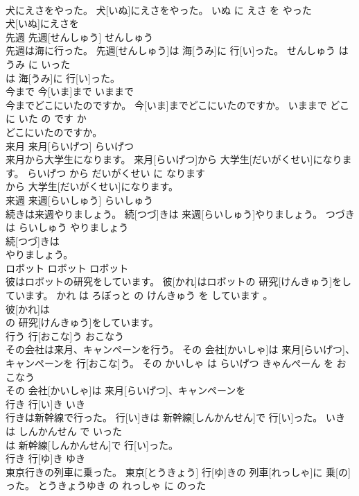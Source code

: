 \documentclass[8pt]{extreport}
\begin{document}
\begin{CJK}{UTF8}{min}
\\	犬にえさをやった。	犬[いぬ]にえさをやった。	いぬ に えさ を やった	
\\	犬[いぬ]にえさを
\\	先週	先週[せんしゅう]	せんしゅう	
\\	先週は海に行った。	先週[せんしゅう]は 海[うみ]に 行[い]った。	せんしゅう は うみ に いった	
\\	は 海[うみ]に 行[い]った。		
\\	今まで	今[いま]まで	いままで	
\\	今までどこにいたのですか。	今[いま]までどこにいたのですか。	いままで どこ に いた の です か	
\\	どこにいたのですか。		
\\	来月	来月[らいげつ]	らいげつ	
\\	来月から大学生になります。	来月[らいげつ]から 大学生[だいがくせい]になります。	らいげつ から だいがくせい に なります	
\\	から 大学生[だいがくせい]になります。		
\\	来週	来週[らいしゅう]	らいしゅう	
\\	続きは来週やりましょう。	続[つづ]きは 来週[らいしゅう]やりましょう。	つづき は らいしゅう やりましょう	
\\	続[つづ]きは
\\	やりましょう。		
\\	ロボット	ロボット	ロボット	
\\	彼はロボットの研究をしています。	彼[かれ]はロボットの 研究[けんきゅう]をしています。	かれ は ろぼっと の けんきゅう を しています 。	
\\	彼[かれ]は
\\	の 研究[けんきゅう]をしています。		
\\	行う	行[おこな]う	おこなう	
\\	その会社は来月、キャンペーンを行う。	その 会社[かいしゃ]は 来月[らいげつ]、キャンペーンを 行[おこな]う。	その かいしゃ は らいげつ きゃんぺーん を おこなう	
\\	その 会社[かいしゃ]は 来月[らいげつ]、キャンペーンを
\\	行き	行[い]き	いき	
\\	行きは新幹線で行った。	行[い]きは 新幹線[しんかんせん]で 行[い]った。	いき は しんかんせん で いった	
\\	は 新幹線[しんかんせん]で 行[い]った。		
\\	行き	行[ゆ]き	ゆき	
\\	東京行きの列車に乗った。	東京[とうきょう] 行[ゆ]きの 列車[れっしゃ]に 乗[の]った。	とうきょうゆき の れっしゃ に のった	

\end{CJK}
\end{document}

